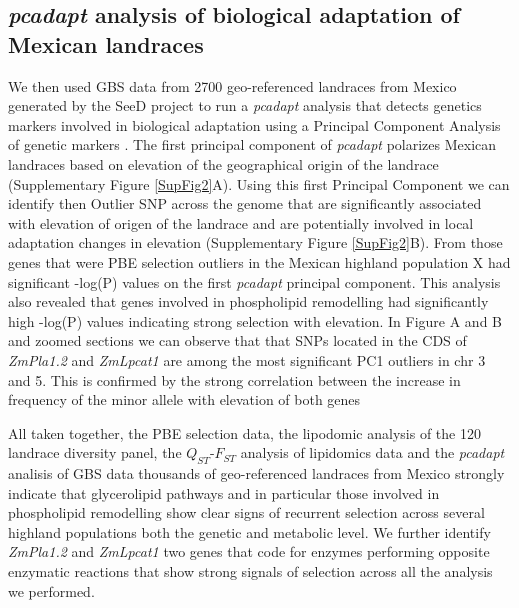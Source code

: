 \documentclass[9pt,twocolumn,twoside,lineno]{gsajnl}
\begin{document}
\subsection{\textit{pcadapt} analysis of biological adaptation of Mexican landraces} 

We then used GBS data from 2700 geo-referenced landraces from Mexico generated by the SeeD project \citep{Romero_Navarro2017-cn, Gates2019-xu} to run a \textit{pcadapt} analysis that detects genetics markers involved in biological adaptation using a Principal Component Analysis of genetic markers \citep{Luu2017-ws}. The first principal component of \textit{pcadapt} polarizes Mexican landraces based on elevation of the geographical origin of the landrace (Supplementary Figure \ref{SupFig2}A). Using this first Principal Component we can identify then Outlier SNP across the genome that are significantly associated with elevation of origen of the landrace and are potentially involved in local adaptation changes in elevation (Supplementary Figure \ref{SupFig2}B). 
From those genes that were PBE selection outliers in the Mexican highland population X had significant -log(P) values on the first \textit{pcadapt} principal component. This analysis also revealed that genes involved in phospholipid remodelling had significantly high -log(P) values indicating strong selection with elevation. In Figure A and B and zoomed sections we can observe that that SNPs located in the CDS of \textit{ZmPla1.2} and \textit{ZmLpcat1} are among the most significant PC1 outliers in chr 3 and 5. This is confirmed by the strong correlation between the increase in frequency of the minor allele with elevation of both genes       

All taken together, the PBE selection data, the lipodomic analysis of the 120 landrace diversity panel, the $Q_{ST}$-$F_{ST}$ analysis of lipidomics data and the \textit{pcadapt} analisis of GBS data thousands of geo-referenced landraces from Mexico strongly indicate that glycerolipid pathways and in particular those involved in phospholipid remodelling show clear signs of recurrent selection across several highland populations both the genetic and metabolic level. We further identify \textit{ZmPla1.2} and \textit{ZmLpcat1} two genes that code for enzymes performing opposite enzymatic reactions that show strong signals of selection across all the analysis we performed.   
\end{document}
